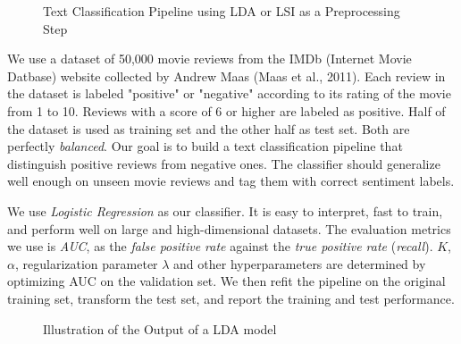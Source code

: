\documentclass{article}
\begin{document}
\begin{figure}[h!]
  \centering
  \caption{Text Classification Pipeline using LDA or LSI as a Preprocessing Step}
  \label{fig:workflow}
\end{figure}

We use a dataset of 50,000 movie reviews from the IMDb (Internet Movie Datbase) website collected by Andrew Maas (Maas et al., 2011). Each review in the dataset is labeled "positive" or "negative" according to its rating of the movie from 1 to 10. Reviews with a score of 6 or higher are labeled as positive. Half of the dataset is used as training set and the other half as test set. Both are perfectly \emph{balanced}. Our goal is to build a text classification pipeline that distinguish positive reviews from negative ones. The classifier should generalize well enough on unseen movie reviews and tag them with correct sentiment labels.

We use \emph{Logistic Regression} as our classifier. It is easy to interpret, fast to train, and perform well on large and high-dimensional datasets. The evaluation metrics we use is \emph{AUC}, as the \emph{false positive rate} against the \emph{true positive rate} (\emph{recall}). $K$, $\alpha$, regularization parameter $\lambda$ and other hyperparameters are determined by optimizing AUC on the validation set. We then refit the pipeline on the original training set, transform the test set, and report the training and test performance.

\begin{figure}[h!]
  \centering
  \caption{Illustration of the Output of a LDA model}
  \label{fig:topic_word}
\end{figure}
\end{document}
